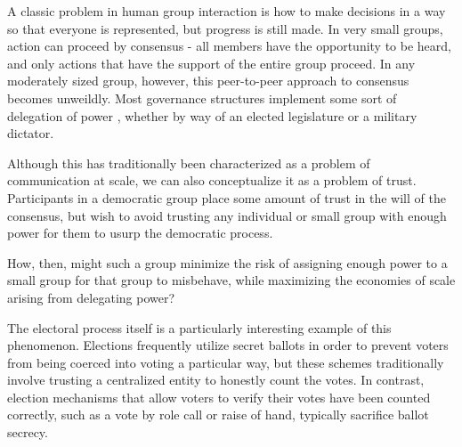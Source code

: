 %
A classic problem in human group interaction is how to make decisions in a way
so that everyone is represented, but progress is still made. In very small
groups, action can proceed by consensus - all members have the opportunity to be
heard, and only actions that have the support of the entire group proceed. In
any moderately sized group, however, this peer-to-peer approach to consensus
becomes unweildly. Most governance structures implement some sort of delegation
of power \tocite, whether by way of an elected legislature or a military
dictator.

Although this has traditionally been characterized as a problem of communication
at scale, we can also conceptualize it as a problem of trust. Participants in a
democratic group place some amount of trust in the will of the consensus, but
wish to avoid trusting any individual or small group with enough power for them
to usurp the democratic process.

How, then, might such a group minimize the risk of assigning enough power to a
small group for that group to misbehave, while maximizing the economies of scale
arising from delegating power?

The electoral process itself is a particularly interesting example of this
phenomenon. Elections frequently utilize secret ballots in order to prevent
voters from being coerced into voting a particular way\tocite, but these schemes
traditionally involve trusting a centralized entity to honestly count the votes.
In contrast, election mechanisms that allow voters to verify their votes have
been counted correctly, such as a vote by role call or raise of hand, typically
sacrifice ballot secrecy\tocite. 

